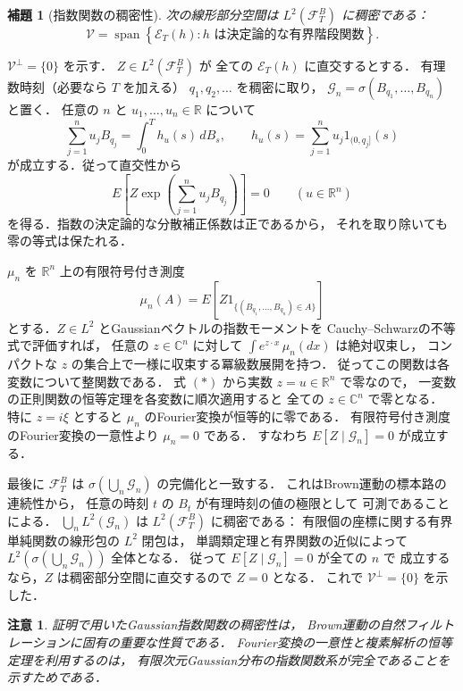 \documentclass[a5paper,10pt,onecolumn]{jsarticle}
\makeatletter
\theoremstyle{mathnotetheorem}
\newtheorem{lemma}[theorem]{補題}
\newtheorem{remark}[theorem]{注意}
\renewcommand{\proofname}{証明}
\renewenvironment{proof}[1][\proofname]{%
  \par\pushQED{\qed}\normalfont\topsep4\p@\@plus2\p@\relax
  \trivlist\item[\hskip\labelsep\bfseries #1]\ignorespaces
}{\popQED\endtrivlist\@endpefalse}
\makeatother
\begin{document}
\begin{lemma}[指数関数の稠密性]\label{lem:exp-dense}
次の線形部分空間は $L^2(\mathcal F_T^B)$ に稠密である：
\[
 \mathcal V=
 \operatorname{span}
 \left\{\mathcal E_T(h):
 h\text{ は決定論的な有界階段関数}\right\}.
\]
\end{lemma}
\begin{proof}
$\mathcal V^\perp=\{0\}$ を示す．
$Z\in L^2(\mathcal F_T^B)$ が
全ての $\mathcal E_T(h)$ に直交するとする．
有理数時刻（必要なら $T$ を加える）
$q_1,q_2,\dots$ を稠密に取り，
$\mathcal G_n=\sigma(B_{q_1},\dots,B_{q_n})$ と置く．
任意の $n$ と $u_1,\dots,u_n\in\mathbb R$ について
\[
 \sum_{j=1}^nu_jB_{q_j}
 =\int_0^T h_u(s)\,dB_s,\qquad
 h_u(s)=\sum_{j=1}^nu_j1_{(0,q_j]}(s)
\]
が成立する．従って直交性から
\[
 E\left[Z\exp\!\left(\sum_{j=1}^nu_jB_{q_j}\right)\right]=0
 \qquad(u\in\mathbb R^n)
 \tag{$*$}
\]
を得る．指数の決定論的な分散補正係数は正であるから，
それを取り除いても零の等式は保たれる．

$\mu_n$ を
$\mathbb R^n$ 上の有限符号付き測度
\[
 \mu_n(A)=E[Z1_{\{(B_{q_1},\dots,B_{q_n})\in A\}}]
\]
とする．$Z\in L^2$ とGaussianベクトルの指数モーメントを
Cauchy--Schwarzの不等式で評価すれば，
任意の $z\in\mathbb C^n$ に対して
$\int e^{z\cdot x}\,\mu_n(dx)$ は絶対収束し，
コンパクトな $z$ の集合上で一様に収束する冪級数展開を持つ．
従ってこの関数は各変数について整関数である．
式 $(*)$ から実数 $z=u\in\mathbb R^n$ で零なので，
一変数の正則関数の恒等定理を各変数に順次適用すると
全ての $z\in\mathbb C^n$ で零となる．
特に $z=i\xi$ とすると
$\mu_n$ のFourier変換が恒等的に零である．
有限符号付き測度のFourier変換の一意性より
$\mu_n=0$ である．
すなわち
$E[Z\mid\mathcal G_n]=0$ が成立する．

最後に
$\mathcal F_T^B$ は
$\sigma(\bigcup_n\mathcal G_n)$ の完備化と一致する．
これはBrown運動の標本路の連続性から，
任意の時刻 $t$ の $B_t$ が有理時刻の値の極限として
可測であることによる．
$\bigcup_nL^2(\mathcal G_n)$ は
$L^2(\mathcal F_T^B)$ に稠密である：
有限個の座標に関する有界単純関数の線形包の
$L^2$ 閉包は，
単調類定理と有界関数の近似によって
$L^2(\sigma(\bigcup_n\mathcal G_n))$ 全体となる．
従って $E[Z\mid\mathcal G_n]=0$ が全ての $n$ で
成立するなら，$Z$ は稠密部分空間に直交するので
$Z=0$ となる．
これで $\mathcal V^\perp=\{0\}$ を示した．
\end{proof}

\begin{remark}
証明で用いたGaussian指数関数の稠密性は，
Brown運動の自然フィルトレーションに固有の重要な性質である．
Fourier変換の一意性と複素解析の恒等定理を利用するのは，
有限次元Gaussian分布の指数関数系が完全であることを
示すためである．
\end{remark}
\end{document}
